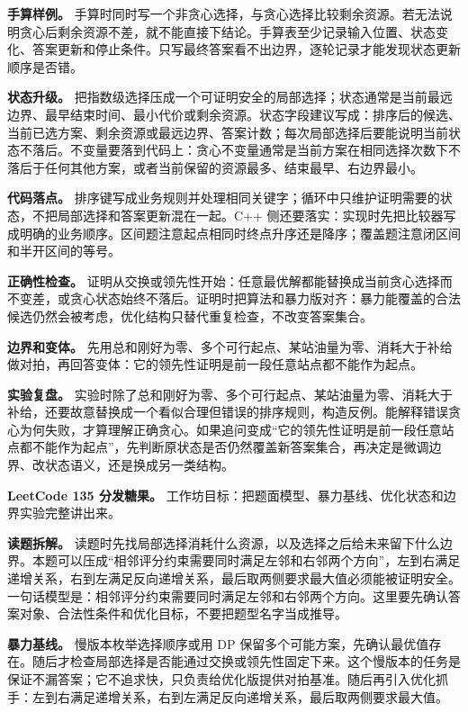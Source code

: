 \textbf{手算样例。} 手算时同时写一个非贪心选择，与贪心选择比较剩余资源。若无法说明贪心后剩余资源不差，就不能直接下结论。手算表至少记录输入位置、状态变化、答案更新和停止条件。只写最终答案看不出边界，逐轮记录才能发现状态更新顺序是否错。

\textbf{状态升级。} 把指数级选择压成一个可证明安全的局部选择；状态通常是当前最远边界、最早结束时间、最小代价或剩余资源。状态字段建议写成：排序后的候选、当前已选方案、剩余资源或最远边界、答案计数；每次局部选择后要能说明当前状态不落后。不变量要落到代码上：贪心不变量通常是当前方案在相同选择次数下不落后于任何其他方案，或者当前保留的资源最多、结束最早、右边界最小。

\textbf{代码落点。} 排序键写成业务规则并处理相同关键字；循环中只维护证明需要的状态，不把局部选择和答案更新混在一起。C++ 侧还要落实：实现时先把比较器写成明确的业务顺序。区间题注意起点相同时终点升序还是降序；覆盖题注意闭区间和半开区间的等号。

\textbf{正确性检查。} 证明从交换或领先性开始：任意最优解都能替换成当前贪心选择而不变差，或贪心状态始终不落后。证明时把算法和暴力版对齐：暴力能覆盖的合法候选仍然会被考虑，优化结构只替代重复检查，不改变答案集合。

\textbf{边界和变体。} 先用总和刚好为零、多个可行起点、某站油量为零、消耗大于补给做对拍，再回答变体：它的领先性证明是前一段任意站点都不能作为起点。

\textbf{实验复盘。} 实验时除了总和刚好为零、多个可行起点、某站油量为零、消耗大于补给，还要故意替换成一个看似合理但错误的排序规则，构造反例。能解释错误贪心为何失败，才算理解正确贪心。如果追问变成“它的领先性证明是前一段任意站点都不能作为起点”，先判断原状态是否仍然覆盖新答案集合，再决定是微调边界、改状态语义，还是换成另一类结构。

\noindent\textbf{LeetCode 135 分发糖果。} 工作坊目标：把题面模型、暴力基线、优化状态和边界实验完整讲出来。

\textbf{读题拆解。} 读题时先找局部选择消耗什么资源，以及选择之后给未来留下什么边界。本题可以压成“相邻评分约束需要同时满足左邻和右邻两个方向”，左到右满足递增关系，右到左满足反向递增关系，最后取两侧要求最大值必须能被证明安全。一句话模型是：相邻评分约束需要同时满足左邻和右邻两个方向。这里要先确认答案对象、合法性条件和优化目标，不要把题型名字当成推导。

\textbf{暴力基线。} 慢版本枚举选择顺序或用 DP 保留多个可能方案，先确认最优值存在。随后才检查局部选择是否能通过交换或领先性固定下来。这个慢版本的任务是保证不漏答案；它不追求快，只负责给优化版提供对拍基准。随后再引入优化抓手：左到右满足递增关系，右到左满足反向递增关系，最后取两侧要求最大值。

